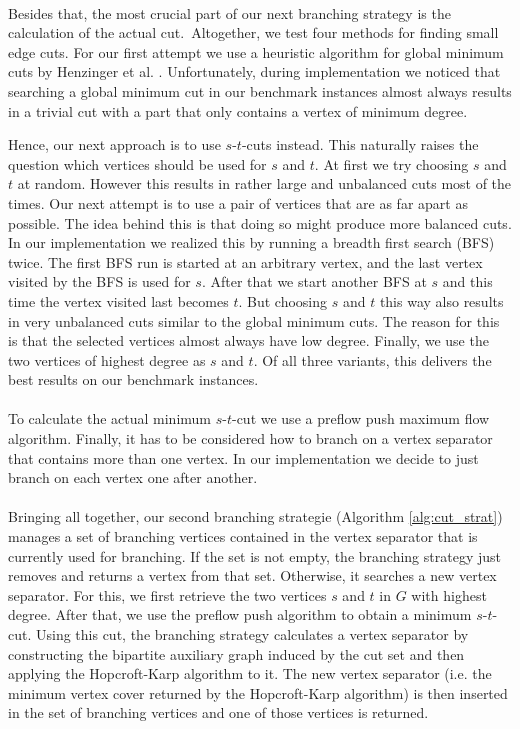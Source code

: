 \documentclass[]{article}
\begin{document}
\paragraph{}
Besides that, the most crucial part of our next branching strategy is the calculation of the actual cut.~Altogether, we test four methods for finding small edge cuts. For our first attempt we use a heuristic algorithm for global minimum cuts by Henzinger et al. \cite{bibid}. Unfortunately, during implementation we noticed that searching a global minimum cut in our benchmark instances almost always results in a trivial cut with a part that only contains a vertex of minimum degree.

Hence, our next approach is  to use $s$-$t$-cuts instead. This naturally raises the question which vertices should be used for $s$ and $t$. At first we try choosing $s$ and $t$ at random. However this results in rather large and unbalanced cuts most of the times. Our next attempt is to use a pair of vertices that are as far apart as possible. The idea behind this is that doing so might produce more balanced cuts. In our implementation we realized this by running a breadth first search (BFS) twice. The first BFS run is started at an arbitrary vertex, and the last vertex visited by the BFS is used for $s$. After that we start another BFS at $s$ and this time the vertex visited last becomes $t$. But choosing $s$ and $t$ this way also results in very unbalanced cuts similar to the global minimum cuts. The reason for this is that the selected vertices almost always have low degree. Finally, we use the two vertices of highest degree as $s$ and $t$. Of all three variants, this delivers the best results on our benchmark instances.

\paragraph{}
To calculate the actual minimum $s$-$t$-cut we use a preflow push maximum flow algorithm. Finally, it has to be considered how to branch on a vertex separator that contains more than one vertex. In our implementation we decide to just branch on each vertex one after another.
\paragraph{}
Bringing all together, our second branching strategie (Algorithm \ref{alg:cut_strat}) manages a set of branching vertices contained in the vertex separator that is currently used for branching. If the set is not empty, the branching strategy just removes and returns a vertex from that set. Otherwise, it searches a new vertex separator. For this, we first retrieve the two vertices $s$ and $t$ in $G$ with highest degree. After that, we use the preflow push algorithm to obtain a minimum $s$-$t$-cut. Using this cut, the branching strategy calculates a vertex separator by constructing the bipartite auxiliary graph induced by the cut set and then applying the Hopcroft-Karp algorithm to it. The new vertex separator (i.e. the minimum vertex cover returned by the Hopcroft-Karp algorithm) is then inserted in the set of branching vertices and one of those vertices is returned.
\end{document}
